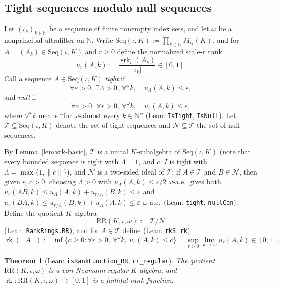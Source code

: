 \documentclass[11pt]{article}
\newtheorem{theorem}{Theorem}[section]
\theoremstyle{definition}
\theoremstyle{remark}
\numberwithin{equation}{section}
\DeclareMathOperator{\rk}{rk}
\DeclareMathOperator{\srk}{srk}
\newcommand{\RR}{\mathrm{RR}}
\newcommand{\N}{\mathbb{N}}
\newcommand{\TT}{\mathcal{T}}
\newcommand{\NN}{\mathcal{N}}
\newcommand{\1}{\mathbf{1}}
\newcommand{\code}[1]{{\normalfont\small\texttt{#1}}}
\begin{document}
\subsection{Tight sequences modulo null sequences}

Let $(\iota_k)_{k \in \N}$ be a sequence of finite nonempty index sets, and let $\omega$ be a nonprincipal ultrafilter on $\N$. Write $\mathrm{Seq}(\iota, K) := \prod_{k \in \N} M_{\iota_k}(K)$, and for $A = (A_k) \in \mathrm{Seq}(\iota, K)$ and $r \ge 0$ define the normalized scale-$r$ rank
\[
u_r(A, k) := \frac{\srk_r(A_k)}{|\iota_k|} \in [0, 1].
\]
Call a sequence $A \in \mathrm{Seq}(\iota, K)$ \emph{tight} if
\[
\forall \varepsilon > 0,\ \exists \Lambda > 0,\ \forall^\omega k,\quad u_\Lambda(A, k) \le \varepsilon,
\]
and \emph{null} if
\[
\forall \varepsilon > 0,\ \forall r > 0,\ \forall^\omega k,\quad u_r(A, k) \le \varepsilon,
\]
where $\forall^\omega k$ means ``for $\omega$-almost every $k \in \N$'' (Lean: \code{IsTight}, \code{IsNull}). Let $\TT \subseteq \mathrm{Seq}(\iota, K)$ denote the set of tight sequences and $\NN \subseteq \TT$ the set of null sequences.

By Lemma~\ref{lem:srk-basic}, $\TT$ is a unital $K$-subalgebra of $\mathrm{Seq}(\iota, K)$ (note that every bounded sequence is tight with $\Lambda = 1$, and $c \cdot I$ is tight with $\Lambda = \max\{1, \|c\|\}$), and $\NN$ is a two-sided ideal of $\TT$: if $A \in \TT$ and $B \in \NN$, then given $\varepsilon, r > 0$, choosing $\Lambda > 0$ with $u_\Lambda(A, k) \le \varepsilon/2$ $\omega$-a.e.\ gives both $u_r(AB, k) \le u_\Lambda(A, k) + u_{r/\Lambda}(B, k) \le \varepsilon$ and $u_r(BA, k) \le u_{r/\Lambda}(B, k) + u_\Lambda(A, k) \le \varepsilon$ $\omega$-a.e.\ (Lean: \code{tight}, \code{nullCon}). Define the quotient $K$-algebra
\[
\RR(K, \iota, \omega) := \TT / \NN
\]
(Lean: \code{RankRings.RR}), and for $A \in \TT$ define (Lean: \code{rkS}, \code{rk})
\[
\rk([A]) := \inf\bigl\{c \ge 0 : \forall r > 0,\ \forall^\omega k,\ u_r(A, k) \le c\bigr\} = \sup_{r > 0} \lim_{k \to \omega} u_r(A, k) \in [0, 1].
\]

\begin{theorem}[Lean: \code{isRankFunction\_RR}, \code{rr\_regular}]
\label{thm:RR-regular}
The quotient $\RR(K, \iota, \omega)$ is a von Neumann regular $K$-algebra, and $\rk\colon \RR(K, \iota, \omega) \to [0, 1]$ is a faithful rank function.
\end{theorem}
\end{document}
